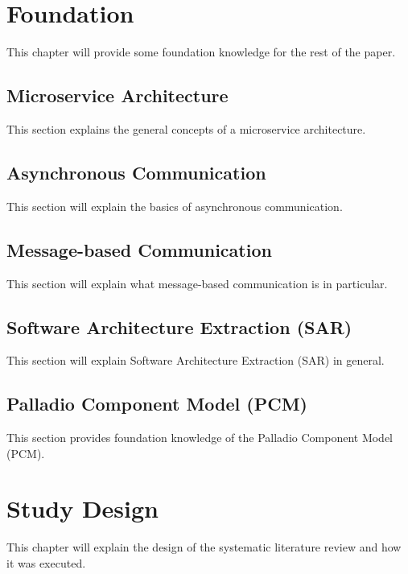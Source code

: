 
\section{Foundation}
\label{cha:Foundation}
This chapter will provide some foundation knowledge for the rest of the paper.

\subsection{Microservice Architecture}
\label{sec:Foundation:MicroserviceArchitecture}
This section explains the general concepts of a microservice architecture.
\cite{Dragoni2017}

\subsection{Asynchronous Communication}
\label{sec:Foundation:AsyncCommunication}
This section will explain the basics of asynchronous communication.

\subsection{Message-based Communication}
\label{sec:Foundation:MessageBasedCommunication}
This section will explain what message-based communication is in particular.

\subsection{Software Architecture Extraction (SAR)}
\label{sec:Foundation:SAR}
This section will explain Software Architecture Extraction (SAR) in general.

\subsection{Palladio Component Model (PCM)}
\label{sec:Foundation:PCM}
This section provides foundation knowledge of the Palladio Component Model (PCM).
\cite{Becker2008}

\section{Study Design}
\label{cha:StudyDesign}
This chapter will explain the design of the systematic literature review and how it was executed.

